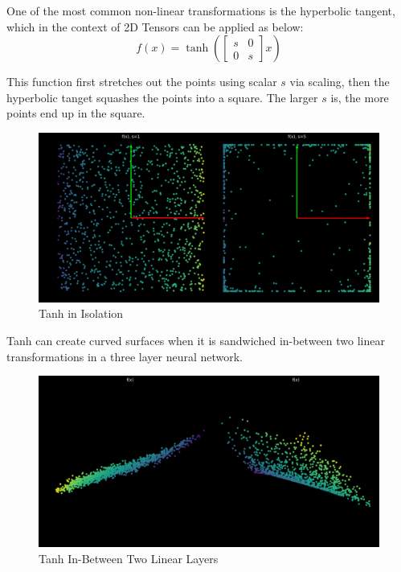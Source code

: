 One of the most common non-linear transformations is the hyperbolic tangent, which in the context of 2D Tensors can be applied as below:
\[f(x) = \tanh(
\begin{bmatrix}
s & 0\\
0 & s
\end{bmatrix}
x)\]

This function first stretches out the points using scalar $s$ via scaling, then the hyperbolic tanget squashes the points into a square.
The larger $s$ is, the more points end up in the square.

\begin{figure}[h!]
\begin{center}
\includegraphics{labs/01/images/tanh.png}
\end{center} 
\caption{Tanh in Isolation}
\end{figure}

Tanh can create curved surfaces when it is sandwiched in-between two linear transformations in a three layer neural network.

\begin{figure}[h!]
\begin{center}
\includegraphics{labs/01/images/tanh_sandwich.png}
\end{center} 
\caption{Tanh In-Between Two Linear Layers}
\end{figure}
